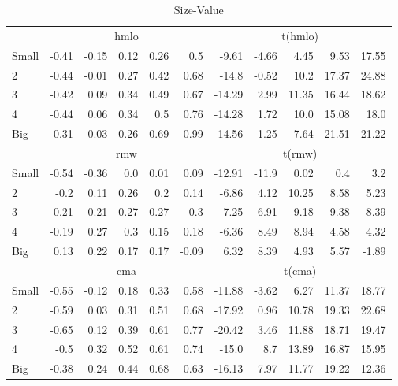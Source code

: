 \begin{table}[!ht]
\begin{tabular}{lrrrrrrrrrr}
  

      & \multicolumn{5}{c}{hmlo} & \multicolumn{5}{c}{t(hmlo)} \\
    \cmidrule(r){2-6} \cmidrule(r){7-11}
      Small  & -0.41  & -0.15  & 0.12  & 0.26  & 0.5   & -9.61  & -4.66  & 4.45  & 9.53  & 17.55  \\
          2  & -0.44  & -0.01  & 0.27  & 0.42  & 0.68   & -14.8  & -0.52  & 10.2  & 17.37  & 24.88  \\
          3  & -0.42  & 0.09  & 0.34  & 0.49  & 0.67   & -14.29  & 2.99  & 11.35  & 16.44  & 18.62  \\
          4  & -0.44  & 0.06  & 0.34  & 0.5  & 0.76   & -14.28  & 1.72  & 10.0  & 15.08  & 18.0  \\
      Big    & -0.31  & 0.03  & 0.26  & 0.69  & 0.99   & -14.56  & 1.25  & 7.64  & 21.51  & 21.22  \\

  

      & \multicolumn{5}{c}{rmw} & \multicolumn{5}{c}{t(rmw)} \\
    \cmidrule(r){2-6} \cmidrule(r){7-11}
      Small  & -0.54  & -0.36  & 0.0  & 0.01  & 0.09   & -12.91  & -11.9  & 0.02  & 0.4  & 3.2  \\
          2  & -0.2  & 0.11  & 0.26  & 0.2  & 0.14   & -6.86  & 4.12  & 10.25  & 8.58  & 5.23  \\
          3  & -0.21  & 0.21  & 0.27  & 0.27  & 0.3   & -7.25  & 6.91  & 9.18  & 9.38  & 8.39  \\
          4  & -0.19  & 0.27  & 0.3  & 0.15  & 0.18   & -6.36  & 8.49  & 8.94  & 4.58  & 4.32  \\
      Big    & 0.13  & 0.22  & 0.17  & 0.17  & -0.09   & 6.32  & 8.39  & 4.93  & 5.57  & -1.89  \\

  

      & \multicolumn{5}{c}{cma} & \multicolumn{5}{c}{t(cma)} \\
    \cmidrule(r){2-6} \cmidrule(r){7-11}
      Small  & -0.55  & -0.12  & 0.18  & 0.33  & 0.58   & -11.88  & -3.62  & 6.27  & 11.37  & 18.77  \\
          2  & -0.59  & 0.03  & 0.31  & 0.51  & 0.68   & -17.92  & 0.96  & 10.78  & 19.33  & 22.68  \\
          3  & -0.65  & 0.12  & 0.39  & 0.61  & 0.77   & -20.42  & 3.46  & 11.88  & 18.71  & 19.47  \\
          4  & -0.5  & 0.32  & 0.52  & 0.61  & 0.74   & -15.0  & 8.7  & 13.89  & 16.87  & 15.95  \\
      Big    & -0.38  & 0.24  & 0.44  & 0.68  & 0.63   & -16.13  & 7.97  & 11.77  & 19.22  & 12.36  \\

  

  \bottomrule
\end{tabular}
\caption{Size-Value} 
\label{25_Size_Value}
\end{table}